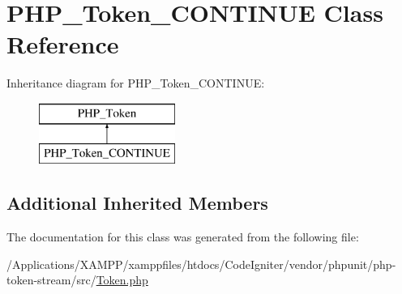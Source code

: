 \hypertarget{class_p_h_p___token___c_o_n_t_i_n_u_e}{}\section{P\+H\+P\+\_\+\+Token\+\_\+\+C\+O\+N\+T\+I\+N\+UE Class Reference}
\label{class_p_h_p___token___c_o_n_t_i_n_u_e}
Inheritance diagram for P\+H\+P\+\_\+\+Token\+\_\+\+C\+O\+N\+T\+I\+N\+UE\+:\begin{figure}[H]
\begin{center}
\leavevmode
\includegraphics[height=2.000000cm]{class_p_h_p___token___c_o_n_t_i_n_u_e}
\end{center}
\end{figure}
\subsection*{Additional Inherited Members}


The documentation for this class was generated from the following file\+:\begin{DoxyCompactItemize}
\item 
/\+Applications/\+X\+A\+M\+P\+P/xamppfiles/htdocs/\+Code\+Igniter/vendor/phpunit/php-\/token-\/stream/src/\mbox{\hyperlink{_token_8php}{Token.\+php}}\end{DoxyCompactItemize}
